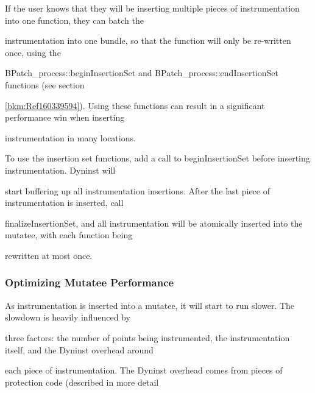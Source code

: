{{\bigskip



{

If the user knows that they will be inserting multiple pieces of instrumentation into one function, they can batch the

instrumentation into one bundle, so that the function will only be re-written once, using the

BPatch_process::beginInsertionSet and BPatch_­process::end­Inser­tion­Set functions (see section

\ref{bkm:Ref160339594}). Using these functions can result in a significant performance win when inserting

instrumentation in many locations.}





\bigskip



{

To use the insertion set functions, add a call to beginInsertionSet before inserting instrumentation. Dyninst will

start buffering up all instrumentation insertions. After the last piece of instrumentation is inserted, call

finalizeInsertionSet, and all instrumentation will be atomically inserted into the mutatee, with each function being

rewritten at most once.}





\bigskip



\subsubsection{Optimizing Mutatee Performance}



\bigskip



{

As instrumentation is inserted into a mutatee, it will start to run slower. The slowdown is heavily influenced by

three factors: the number of points being instrumented, the instrumentation itself, and the Dyninst overhead around

each piece of instrumentation. The Dyninst overhead comes from pieces of protection code (described in more detail

}}}
